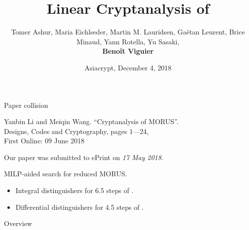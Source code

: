 \documentclass[aspectratio=169,10pt,webfont]{beamer}
\title{Linear Cryptanalysis of \MORUS}
\author{Tomer Ashur, Maria Eichlseder, Martin M. Lauridsen, Ga\"etan Leurent, Brice Minaud, Yann Rotella, Yu Sasaki,\\ \textbf{Beno\^it Viguier}}
\date[Short Occasion]{Asiacrypt, December 4, 2018}
\begin{document}
\begin{frame}
  \titlepage
\end{frame}



\begin{frame}{\itemwrap{\faBirthdayCake} Paper collision}

  Yanbin Li and Meiqin Wang. “Cryptanalysis of MORUS”.\\
  Designs, Codes and Cryptography, pages 1—24, \\
  \alert{First Online: 09 June 2018}

  Our paper was submitted to ePrint on \emph{17 May 2018}.
  \vspace{0.5cm}

  \begin{block}{MILP-aided search for reduced MORUS.}
  \begin{itemize}
    \item Integral distinguishers for 6.5 steps of \MORUS[640].
    \item Differential distinguishers for 4.5 steps of \MORUS[1280].
  \end{itemize}
  \end{block}

\end{frame}









\begin{frame}{\itemwrap{\faMapSigns} Overview}
  \tableofcontents
\end{frame}
\end{document}
